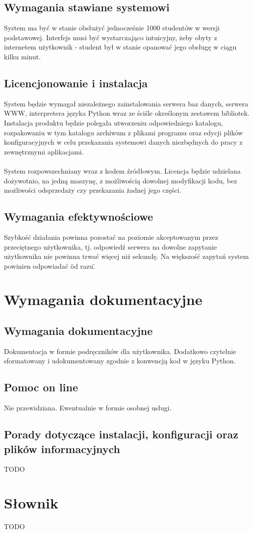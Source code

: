 \documentclass[11pt,leqno]{article}
\begin{document}
\subsection{Wymagania stawiane systemowi}

System ma być w stanie obsłużyć jednocześnie 1000 studentów w wersji podstawowej. Interfejs musi być wystarczająco intuicyjny, żeby obyty z internetem użytkownik - student był w stanie opanować jego obsługę w ciągu kilku minut.

\subsection{Licencjonowanie i instalacja}
System będzie wymagał niezależnego zainstalowania serwera baz danych, serwera WWW, interpretera języka Python wraz ze ściśle określonym zestawem bibliotek. Instalacja produktu będzie polegała utworzeniu odpowiedniego katalogu, rozpakowaniu w tym katalogu archiwum z plikami programu oraz edycji plików konfiguracyjnych w celu przekazania systemowi danych niezbędnych do pracy z zewnętrznymi aplikacjami. \\ \\
System rozpowszechniany wraz z kodem źródłowym. Licencja będzie udzielana dożywotnio, na jedną maszynę, z możliwością dowolnej modyfikacji kodu, bez możliwości odsprzedaży czy przekazania żadnej jego części.

\subsection{Wymagania efektywnościowe}
Szybkość działania powinna pozostać na poziomie akceptowanym przez przeciętnego użytkownika, tj. odpowiedź serwera na dowolne zapytanie użytkownika nie powinna trwać więcej niż sekundę. Na większość zapytań system powinien odpowiadać \"od razu\".

\section{Wymagania dokumentacyjne}

\subsection{Wymagania dokumentacyjne}
Dokumentacja w formie podręczników dla użytkownika. Dodatkowo czytelnie sformatowany i udokumentowany zgodnie z konwencją kod w języku Python.

\subsection{Pomoc on line}

Nie przewidziana. Ewentualnie w formie osobnej usługi.

\subsection{Porady dotyczące instalacji, konfiguracji oraz plików informacyjnych}

TODO

\section{Słownik}

TODO
\end{document}
